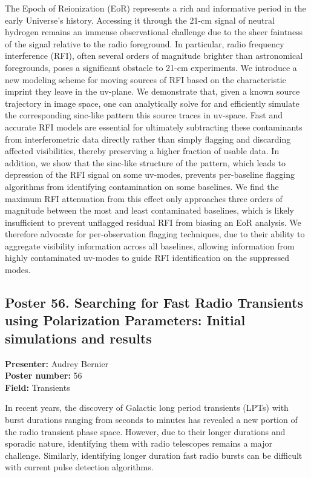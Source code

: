 The Epoch of Reionization (EoR) represents a rich and informative period in the early Universe's history. Accessing it through the 21-cm signal of neutral hydrogen remains an immense observational challenge due to the sheer faintness of the signal relative to the radio foreground. In particular, radio frequency interference (RFI), often several orders of magnitude brighter than astronomical foregrounds, poses a significant obstacle to 21-cm experiments. We introduce a new modeling scheme for moving sources of RFI based on the characteristic imprint they leave in the uv-plane. We demonstrate that, given a known source trajectory in image space, one can analytically solve for and efficiently simulate the corresponding sinc-like pattern this source traces in uv-space. Fast and accurate RFI models are essential for ultimately subtracting these contaminants from interferometric data directly rather than simply flagging and discarding affected visibilities, thereby preserving a higher fraction of usable data. In addition, we show that the sinc-like structure of the pattern, which leads to depression of the RFI signal on some uv-modes, prevents per-baseline flagging algorithms from identifying contamination on some baselines. We find the maximum RFI attenuation from this effect only approaches three orders of magnitude between the most and least contaminated baselines, which is likely insufficient to prevent unflagged residual RFI from biasing an EoR analysis. We therefore advocate for per-observation flagging techniques, due to their ability to aggregate visibility information across all baselines, allowing information from highly contaminated uv-modes to guide RFI identification on the suppressed modes.

\hypertarget{poster-abstract-talk-311}{}\label{poster-abstract-page-talk-311}
\subsection*{Poster 56. Searching for Fast Radio Transients using Polarization Parameters: Initial simulations and results}
\textbf{Presenter:} Audrey Bernier\\
\textbf{Poster number:} 56\\
\textbf{Field:} Transients

In recent years, the discovery of Galactic long period transients (LPTs) with burst durations ranging from seconds to minutes has revealed a new portion of the radio transient phase space. However, due to their longer durations and sporadic nature, identifying them with radio telescopes remains a major challenge. Similarly, identifying longer duration fast radio bursts can be difficult with current pulse detection algorithms.

